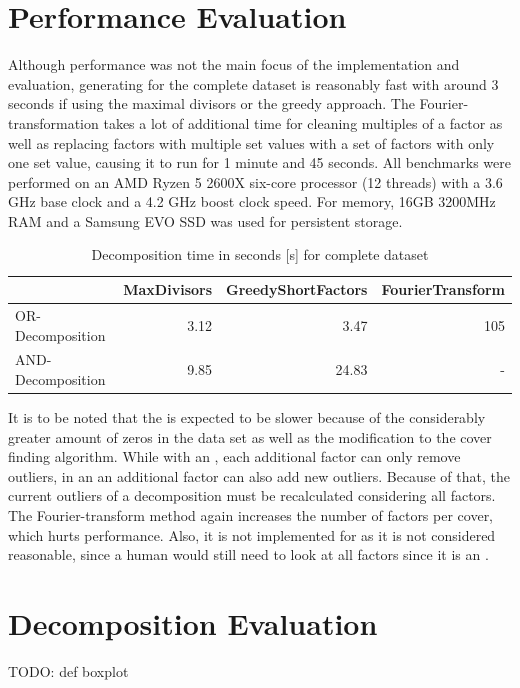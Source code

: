 \section{Performance Evaluation}
\label{ch:Evaluation:performance}
Although performance was not the main focus of the implementation and evaluation, generating \orDecomp for the complete dataset is reasonably fast with around 3 seconds if using the maximal divisors or the greedy approach.
The Fourier-transformation takes a lot of additional time for cleaning multiples of a factor as well as replacing factors with multiple set values with a set of factors with only one set value, causing it to run for 1 minute and 45 seconds.
All benchmarks were performed on an AMD Ryzen 5 2600X six-core processor (12 threads) with a 3.6 GHz base clock and a 4.2 GHz boost clock speed. For memory, 16GB 3200MHz RAM and a Samsung EVO SSD was used for persistent storage.
\begin{table}[h]
	\begin{tabular}{l|rrr}
		 & MaxDivisors & GreedyShortFactors & FourierTransform  \\
		\hline
		 OR-Decomposition & 3.12 & 3.47 & 105 \\
		 AND-Decomposition & 9.85 & 24.83 & - \\
		 	
	\end{tabular}
	\caption{Decomposition time in seconds [s] for complete dataset}
	\label{tab:eval-performance}
\end{table}
It is to be noted that the \andDecomp is expected to be slower because of the considerably greater amount of zeros in the data set as well as the modification to the cover finding algorithm.
While with an \orDecomp, each additional factor can only remove outliers, in an \andDecomp an additional factor can also add new outliers.
Because of that, the current outliers of a decomposition must be recalculated considering all factors.
The Fourier-transform method again increases the number of factors per cover, which hurts performance.
Also, it is not implemented for \andDecomp as it is not considered reasonable, since a human would still need to look at all factors since it is an \andDecomp.

\section{Decomposition Evaluation}
\label{ch:Evaluation:decomposition-quality}
TODO: def boxplot


